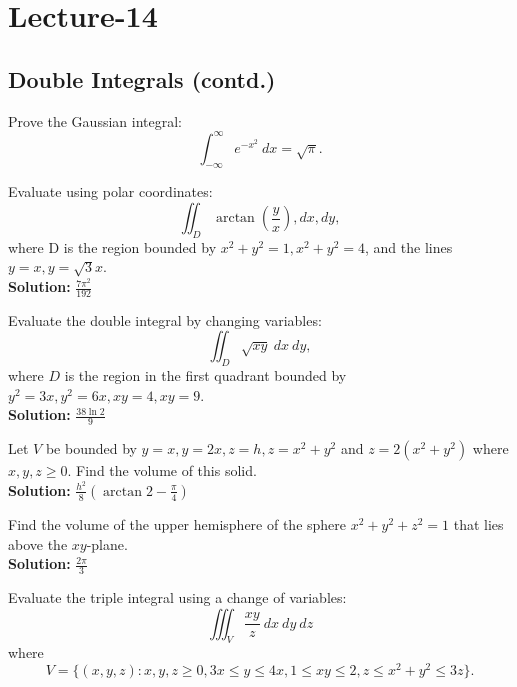 \newpage
\section{Lecture-14}
\subsection{Double Integrals (contd.)}
\begin{example}
Prove the Gaussian integral:
\[
   \int_{-\infty}^{\infty} e^{-x^2}\:dx=\sqrt{\pi}.
\]
\end{example}

\begin{example}
Evaluate using polar coordinates:
$$
   \iint_D \arctan\left(\frac{y}{x}\right),dx,dy,
$$
where D is the region bounded by $x^2+y^2=1, x^2+y^2=4$, and the lines $y=x,y=\sqrt3x$.\\ 
\textbf{Solution:} $\boxed{\frac{7\pi^2}{192}}$
\end{example}


\begin{example}
Evaluate the double integral by changing variables:
$$
   \iint_D \sqrt{xy}\:dx\:dy,
$$
where $D$ is the region in the first quadrant bounded by $y^2=3x, y^2=6x, xy=4, xy=9$.\\
\textbf{Solution:} $\boxed{\frac{38\ln{2}}{9}}$  

\end{example}

\begin{example}
    Let $V$ be bounded by $y=x, y=2x, z=h, z=x^2+y^2$ and $z=2(x^2+y^2)$ where $x,y,z\geq 0$. Find the volume of this solid.\\ 
\textbf{Solution:} $\boxed{\frac{h^2}{8}\left(\arctan 2-\frac{\pi}{4}\right)}$ 
\end{example}

\begin{example}
   Find the volume of the upper hemisphere of the sphere $x^2+y^2+z^2=1$ that lies above the $xy$-plane.\\
\textbf{Solution:} $\boxed{\frac{2\pi}{3}}$
\end{example}

\begin{example}
Evaluate the triple integral using a change of variables:
$$
    \iiint_V \frac{xy}{z}\:dx\:dy\:dz
$$
where
$$
V=\{(x,y,z):x,y,z\ge0,3x\le y\le4x,1\le xy\le2,z\le x^2+y^2\le3z\}.
$$


\end{example}